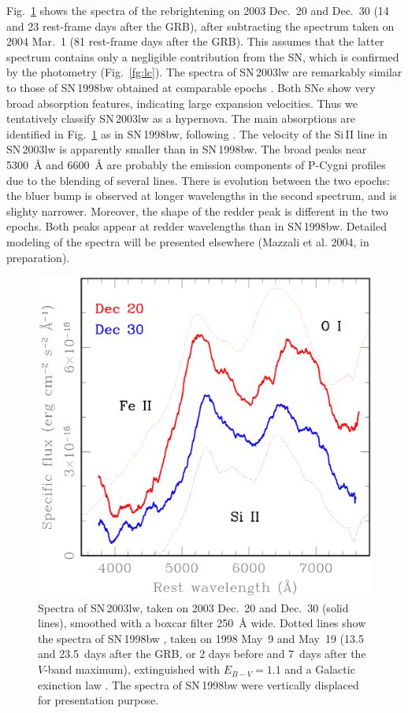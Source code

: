 \documentclass{emulateapj}
\begin{document}
Fig.~\ref{fg:spec} shows the spectra of the rebrightening on 2003
Dec.~20 and Dec.~30 (14 and 23 rest-frame days after the GRB), after
subtracting the spectrum taken on 2004 Mar.~1 (81 rest-frame days after
the GRB). This assumes that the latter spectrum contains only a
negligible contribution from the SN, which is confirmed by the
photometry (Fig.~\ref{fg:lc}). The spectra of SN\,2003lw are remarkably
similar to those of SN\,1998bw obtained at comparable epochs
\citep[shown as dotted lines in Fig.~\ref{fg:spec}; from][]{Pa01}. Both
SNe show very broad absorption features, indicating large expansion
velocities. Thus we tentatively classify SN\,2003lw as a hypernova. The
main absorptions are identified in Fig.~\ref{fg:spec} as in SN\,1998bw,
following \citet{Iw98}. The velocity of the Si\,II line in SN\,2003lw is
apparently smaller than in SN\,1998bw. The broad peaks near 5300~\AA{}
and 6600~\AA{} are probably the emission components of P-Cygni profiles
due to the blending of several lines. There is evolution between the two
epochs: the bluer bump is observed at longer wavelengths in the second
spectrum, and is slighty narrower. Moreover, the shape of the redder
peak is different in the two epochs.  Both peaks appear at redder
wavelengths than in SN\,1998bw. Detailed modeling of the spectra will be
presented elsewhere (Mazzali et al. 2004, in preparation).\bigskip


\begin{figure}\centering
  \includegraphics[width=\columnwidth,keepaspectratio]{spec.ps}
  \caption{Spectra of SN\,2003lw, taken on 2003 Dec.~20 and Dec.~30
  (solid lines), smoothed with a boxcar filter 250~\AA{} wide.  Dotted
  lines show the spectra of SN\,1998bw \citep[from][]{Pa01}, taken on
  1998 May~9 and May~19 (13.5 and 23.5~days after the GRB, or 2 days
  before and 7~days after the $V$-band maximum), extinguished with
  $E_{B-V} = 1.1$ and a Galactic exinction law \citep{Ca89}. The spectra
  of SN\,1998bw were vertically displaced for presentation
  purpose.\label{fg:spec}}
\end{figure}
\end{document}
